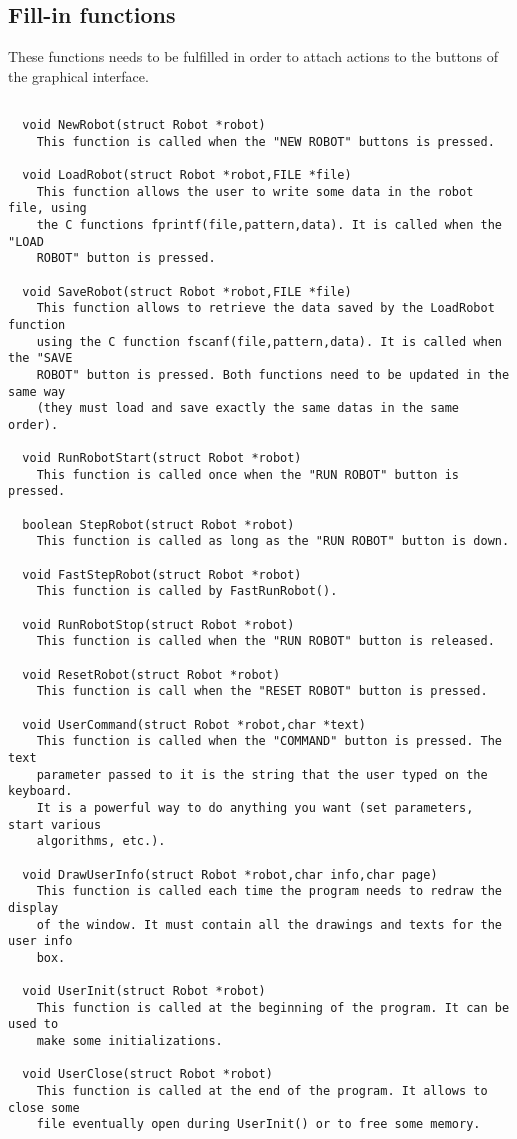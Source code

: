 \documentclass[a4paper,twoside]{article}
\begin{document}
\subsection{Fill-in functions}

These functions needs to be fulfilled in order to attach actions to the
buttons of the graphical interface.

\begin{verbatim}

  void NewRobot(struct Robot *robot)
    This function is called when the "NEW ROBOT" buttons is pressed.

  void LoadRobot(struct Robot *robot,FILE *file)
    This function allows the user to write some data in the robot file, using
    the C functions fprintf(file,pattern,data). It is called when the "LOAD
    ROBOT" button is pressed.

  void SaveRobot(struct Robot *robot,FILE *file)
    This function allows to retrieve the data saved by the LoadRobot function
    using the C function fscanf(file,pattern,data). It is called when the "SAVE
    ROBOT" button is pressed. Both functions need to be updated in the same way
    (they must load and save exactly the same datas in the same order).

  void RunRobotStart(struct Robot *robot)
    This function is called once when the "RUN ROBOT" button is pressed.

  boolean StepRobot(struct Robot *robot)
    This function is called as long as the "RUN ROBOT" button is down.

  void FastStepRobot(struct Robot *robot)
    This function is called by FastRunRobot().

  void RunRobotStop(struct Robot *robot)
    This function is called when the "RUN ROBOT" button is released.

  void ResetRobot(struct Robot *robot)
    This function is call when the "RESET ROBOT" button is pressed.

  void UserCommand(struct Robot *robot,char *text)
    This function is called when the "COMMAND" button is pressed. The text
    parameter passed to it is the string that the user typed on the keyboard.
    It is a powerful way to do anything you want (set parameters, start various
    algorithms, etc.).

  void DrawUserInfo(struct Robot *robot,char info,char page)
    This function is called each time the program needs to redraw the display
    of the window. It must contain all the drawings and texts for the user info
    box. 

  void UserInit(struct Robot *robot)
    This function is called at the beginning of the program. It can be used to
    make some initializations.

  void UserClose(struct Robot *robot)
    This function is called at the end of the program. It allows to close some
    file eventually open during UserInit() or to free some memory.

\end{verbatim}
\end{document}
